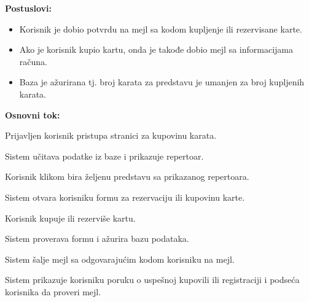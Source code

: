 \documentclass[a4paper]{article}
\begin{document}
\noindent\textbf{Postuslovi:} 
  \begin{itemize}
    \item Korisnik je dobio potvrdu na mejl sa kodom kupljenje ili rezervisane karte.
    \item Ako je korisnik kupio kartu, onda je takođe dobio mejl sa informacijama računa.
    \item Baza je ažurirana tj. broj karata za predstavu je umanjen za broj kupljenih karata.
  \end{itemize}

\noindent\textbf{Osnovni tok:}
  \begin{legal}
    \item Prijavljen korisnik pristupa stranici za kupovinu karata. 
    \item Sistem učitava podatke iz baze i prikazuje repertoar.
    \item Korisnik klikom bira željenu predstavu sa prikazanog repertoara.
    \item Sistem otvara korisniku formu za rezervaciju ili kupovinu karte.
    \item Korisnik kupuje ili rezerviše kartu.
    \item Sistem proverava formu i ažurira bazu podataka.
    \item Sistem šalje mejl sa odgovarajućim kodom korisniku na mejl.
    \item Sistem prikazuje korisniku poruku o uspešnoj kupovili ili registraciji i podseća
          korisnika da proveri mejl.
  \end{legal}
\end{document}
